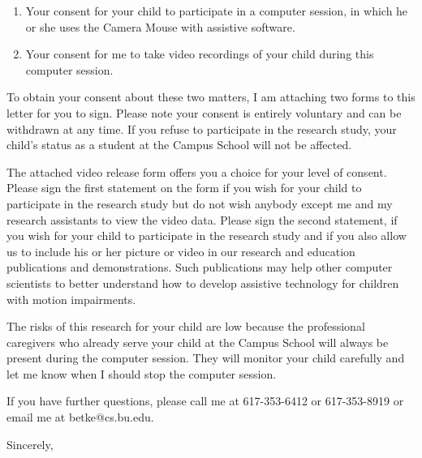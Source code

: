 \begin{letter}
\begin{enumerate}
\item Your consent for your child to participate in a computer
session, in which he or she uses the Camera Mouse with assistive
software.
\item Your consent for me to take video recordings of your child
during this computer session.
\end{enumerate}

To obtain your consent about these two matters, I am attaching two
forms to this letter for you to sign.  Please note your consent is
entirely voluntary and can be withdrawn at any time.  If you refuse to
participate in the research study, your child's status as a student at
the Campus School will not be affected.

The attached video release form offers you a choice for your level of
consent.  Please sign the first statement on the form if you wish for
your child to participate in the research study but do not wish
anybody except me and my research assistants to view the video data.
Please sign the second statement, if you wish for your child to
participate in the research study and if you also allow us to include
his or her picture or video in our research and education publications
and demonstrations.  Such publications may help other computer
scientists to better understand how to develop assistive technology
for children with motion impairments.

The risks of this research for your child are low because the
professional caregivers who already serve your child at the Campus
School will always be present during the computer session.  They will
monitor your child carefully and let me know when I should stop the
computer session.

If you have further questions, please call me at 617-353-6412 or
617-353-8919 or email me at betke@cs.bu.edu.
\begin{center}
\closing{Sincerely,
}
\end{center}

\end{letter}

 
